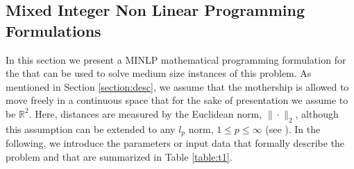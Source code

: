 \subsection{Mixed Integer Non Linear Programming Formulations}\label{Form}
\noindent
In this section we present a MINLP mathematical programming formulation for the \AMD %
that can be used to solve medium size instances of this problem.
\noindent
As mentioned in Section \ref{section:desc}, we assume that the mothership is allowed to move freely in a continuous space that for the sake of presentation we  assume to be $\mathbb R^2$. Here, distances are measured by the Euclidean norm, $\|\cdot\|_2$, although this assumption can be extended to any $l_p$ norm, $1\leq p\leq \infty$ (see \cite{Blanco2017}).
\noindent
In the following, we introduce the parameters or input data that formally describe the problem and that are summarized in Table \ref{table:t1}.

